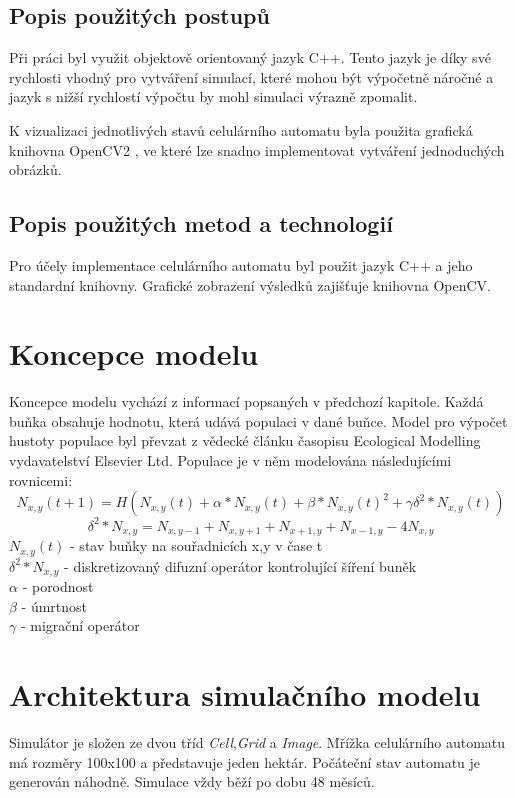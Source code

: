 \documentclass[a4paper,11pt]{article}
\begin{document}
\subsection{Popis použitých postupů}
Při práci byl využit objektově orientovaný jazyk C++. Tento jazyk je díky své rychlosti vhodný pro vytváření simulací, které mohou být výpočetně náročné a jazyk s nižší rychlostí výpočtu by mohl simulaci výrazně zpomalit. 

K vizualizaci jednotlivých stavů celulárního automatu byla použita grafická knihovna OpenCV2 \cite{opencv2}, ve které lze snadno implementovat vytváření jednoduchých obrázků. 

\subsection{Popis použitých metod a technologií}
Pro účely implementace celulárního automatu byl použit jazyk C++ a jeho standardní knihovny. Grafické zobrazení výsledků zajišťuje knihovna OpenCV.

\section{Koncepce modelu}
Koncepce modelu vychází z informací popsaných v předchozí kapitole. Každá buňka obsahuje hodnotu, která udává populaci v dané buňce. Model pro výpočet hustoty populace byl převzat z vědecké článku \cite{OurCA} časopisu Ecological Modelling vydavatelství Elsevier Ltd. Populace je v něm modelována následujícími rovnicemi:
\begin{equation}
N_{x,y}(t+1) = H(N_{x,y}(t) + \alpha*N_{x,y}(t) + \beta*N_{x,y}(t)^2 + \gamma\delta^2*N_{x,y}(t))
\end{equation}
\begin{equation}
\delta^2*N_{x,y} = N_{x,y-1} + N_{x,y+1} + N_{x+1,y} + N_{x-1,y} - 4N_{x,y}
\end{equation}
\( N_{x,y}(t) \) - stav buňky na souřadnicích x,y v čase t\ \\
\( \delta^2*N_{x,y} \) - diskretizovaný difuzní operátor kontrolující šíření buněk \\
\( \alpha \) - porodnost \\
\( \beta \) - úmrtnost \\
\( \gamma \) - migrační operátor\\


\section{Architektura simulačního modelu}
Simulátor je složen ze dvou tříd \emph{Cell},\emph{Grid} a \emph{Image}. Mřížka celulárního automatu má rozměry 100x100 a představuje jeden hektár. Počáteční stav automatu je generován náhodně. Simulace vždy běží po dobu 48 měsíců.
\end{document}
